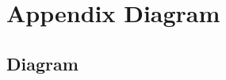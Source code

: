 \thispagestyle{firstPageOfChapter}
\chapter{Appendix Diagram} \label{chap:diagramm}
\section{Diagram}
\label{app:diagram}